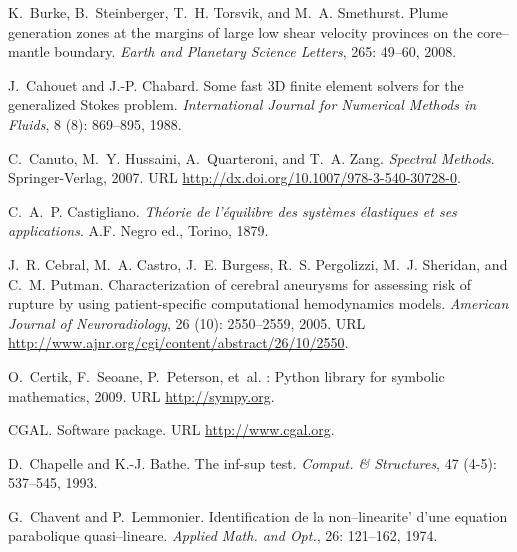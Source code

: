\begin{thebibliography}{467}
K.~Burke, B.~Steinberger, T.~H. Torsvik, and M.~A. Smethurst.
\newblock Plume generation zones at the margins of large low shear velocity
  provinces on the core–mantle boundary.
\newblock \emph{Earth and Planetary Science Letters}, 265: 49--60,
  2008.

J.~Cahouet and J.-P. Chabard.
\newblock Some fast {3D} finite element solvers for the generalized {S}tokes
  problem.
\newblock \emph{International Journal for Numerical Methods in Fluids},
  8 (8): 869--895, 1988.

C.~Canuto, M.~Y. Hussaini, A.~Quarteroni, and T.~A. Zang.
\newblock \emph{Spectral Methods}.
\newblock Springer-Verlag, 2007.
\newblock URL \url{http://dx.doi.org/10.1007/978-3-540-30728-0}.

C.~A.~P. Castigliano.
\newblock \emph{Th\'eorie de l'\'equilibre des syst\`emes \'elastiques et ses
  applications}.
\newblock A.F. Negro ed., Torino, 1879.

J.~R. Cebral, M.~A. Castro, J.~E. Burgess, R.~S. Pergolizzi, M.~J. Sheridan,
  and C.~M. Putman.
\newblock Characterization of cerebral aneurysms for assessing risk of rupture
  by using patient-specific computational hemodynamics models.
\newblock \emph{American Journal of Neuroradiology}, 26 (10):
  2550--2559, 2005.
\newblock URL \url{http://www.ajnr.org/cgi/content/abstract/26/10/2550}.

O.~Certik, F.~Seoane, P.~Peterson, et~al.
: {Python} library for symbolic mathematics, 2009.
\newblock URL \url{http://sympy.org}.

CGAL.
\newblock Software package.
\newblock URL \url{http://www.cgal.org}.

D.~Chapelle and K.-J. Bathe.
\newblock The inf-sup test.
\newblock \emph{Comput. \& Structures}, 47 (4-5): 537--545,
  1993.

G.~Chavent and P.~Lemmonier.
\newblock Identification de la non--linearite' d'une equation parabolique
  quasi--lineare.
\newblock \emph{Applied Math. and Opt.}, 26: 121--162, 1974.


\end{thebibliography}
